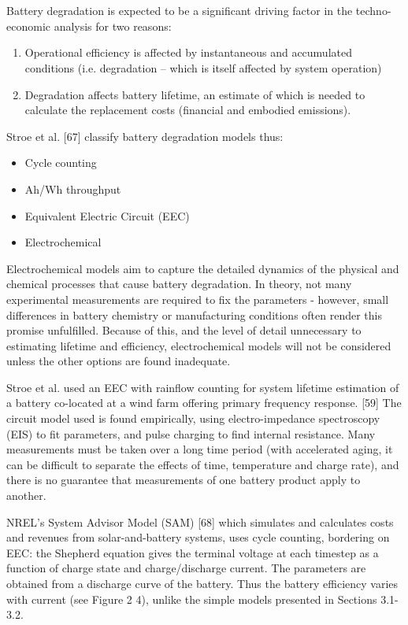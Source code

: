 \documentclass[report_18month.tex]{subfiles}
\begin{document}
\section{}
Battery degradation is expected to be a significant driving factor in the techno-economic analysis for two reasons:
\begin{enumerate}
\item Operational efficiency is affected by instantaneous and accumulated conditions (i.e. degradation – which is itself affected by system operation)
\item Degradation affects battery lifetime, an estimate of which is needed to calculate the replacement costs (financial and embodied emissions).
\end{enumerate}

Stroe et al. [67] classify battery degradation models thus:
\begin{itemize}
\item Cycle counting
\item Ah/Wh throughput
\item Equivalent Electric Circuit (EEC)
\item Electrochemical
\end{itemize}

Electrochemical models aim to capture the detailed dynamics of the physical and chemical processes that cause battery degradation. In theory, not many experimental measurements are required to fix the parameters - however, small differences in battery chemistry or manufacturing conditions often render this promise unfulfilled. Because of this, and the level of detail unnecessary to estimating lifetime and efficiency, electrochemical models will not be considered unless the other options are found inadequate.

Stroe et al. used an EEC with rainflow counting for system lifetime estimation of a battery co-located at a wind farm offering primary frequency response. [59] The circuit model used is found empirically, using electro-impedance spectroscopy (EIS) to fit parameters, and pulse charging to find internal resistance. Many measurements must be taken over a long time period (with accelerated aging, it can be difficult to separate the effects of time, temperature and charge rate), and there is no guarantee that measurements of one battery product apply to another.

NREL’s System Advisor Model (SAM) [68] which simulates and calculates costs and revenues from solar-and-battery systems, uses cycle counting, bordering on EEC: the Shepherd equation gives the terminal voltage at each timestep as a function of charge state and charge/discharge current. The parameters are obtained from a discharge curve of the battery. Thus the battery efficiency varies with current (see Figure 2 4), unlike the simple models presented in Sections 3.1-3.2.
\end{document}
